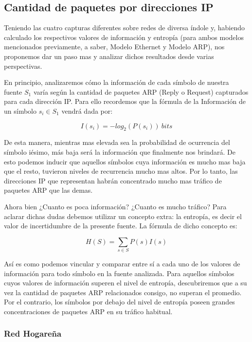 \subsection{Cantidad de paquetes por direcciones IP}

Teniendo las cuatro capturas diferentes sobre redes de diversa índole y, habiendo calculado los respectivos valores de información y entropía (para ambos modelos mencionados previamente, a saber, Modelo Ethernet y Modelo ARP), nos proponemos dar un paso mas y analizar dichos resultados desde varias perspectivas.

En principio, analizaremos cómo la información de cada símbolo de nuestra fuente $S_1$ varía según la cantidad de paquetes ARP (Reply o Request) capturados para cada dirección IP. Para ello recordemos que la fórmula de la Información de un símbolo $s_i \in S_1$ vendrá dada por:

\begin{equation}
 I(s_{i}) = -log_{2}(P(s_{i}))\ bits
\end{equation}

De esta manera, mientras mas elevada sea la probabilidad de ocurrencia del símbolo iésimo, más baja será la información que finalmente nos brindará. De esto podemos inducir que aquellos símbolos cuya información es mucho mas baja que el resto, tuvieron niveles de recurrencia mucho mas altos. Por lo tanto, las direcciones IP que representan habrán concentrado mucho mas tráfico de paquetes ARP que las demas.

Ahora bien ¿Cuanto es poca información? ¿Cuanto es mucho tráfico? Para aclarar dichas dudas debemos utilizar un concepto extra: la entropía, es decir el valor de incertidumbre de la presente fuente. La fórmula de dicho concepto es:

\begin{equation}
 H(S) = \sum_{s \in S} P(s) I(s)
\end{equation}

Así es como podemos vincular y comparar entre sí a cada uno de los valores de información para todo símbolo en la fuente analizada. Para aquellos símbolos cuyos valores de información superen el nivel de entropía, descubriremos que a su vez la cantidad de paquetes ARP relacionados consigo, no superan el promedio. Por el contrario, los símbolos por debajo del nivel de entropía poseen grandes concentraciones de paquetes ARP en su tráfico habitual.

\subsubsection{Red Hogareña}

